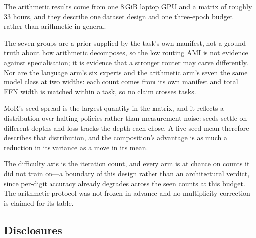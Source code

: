 The arithmetic results come from one 8\,GiB laptop GPU and a matrix of roughly
33 hours, and they describe one dataset design and one three-epoch budget rather
than arithmetic in general.

The seven groups are a prior supplied by the task's own manifest, not a ground
truth about how arithmetic decomposes, so the low routing AMI is not evidence
against specialisation; it is evidence that a stronger router may carve
differently. Nor are the language arm's six experts and the arithmetic arm's
seven the same model class at two widths: each count comes from its own manifest
and total FFN width is matched within a task, so no claim crosses tasks.

MoR's seed spread is the largest quantity in the matrix, and it reflects a
distribution over halting policies rather than measurement noise: seeds settle on
different depths and loss tracks the depth each chose. A five-seed mean therefore
describes that distribution, and the composition's advantage is as much a
reduction in its variance as a move in its mean.

The difficulty axis is the iteration count, and every arm is at chance on counts
it did not train on---a boundary of this design rather than an architectural
verdict, since per-digit accuracy already degrades across the seen counts at this
budget. The arithmetic protocol was not frozen in advance and no multiplicity
correction is claimed for its table.

\subsection*{Disclosures}
\label{sec:honesty}

